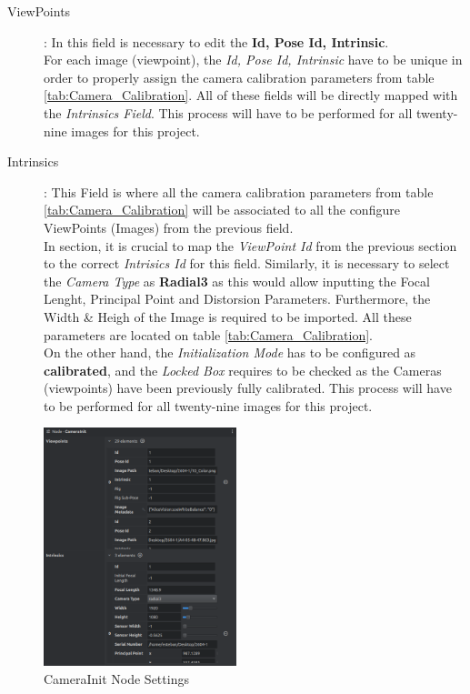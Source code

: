 \documentclass[12pt]{report}
\begin{document}
  \begin{description}
    \item[ViewPoints]: In this field is necessary to edit the \textbf{Id, Pose Id, Intrinsic}. \\
    For each image (viewpoint), the \textit{Id, Pose Id, Intrinsic} have to be unique in order to properly assign the camera calibration parameters from table \ref{tab:Camera_Calibration}. 
    All of these fields will be directly mapped with the \textit{Intrinsics Field}.
    This process will have to be performed for all twenty-nine images for this project. 
    \item[Intrinsics]: This Field is where all the camera calibration parameters from table \ref{tab:Camera_Calibration} will be associated to all the configure ViewPoints (Images) from the previous field.\\
    In section, it is crucial to map the \textit{ViewPoint Id} from the previous section to the correct \textit{Intrisics Id} for this field.
    Similarly, it is necessary to select the \textit{Camera Type} as \textbf{Radial3} as this would allow inputting the Focal Lenght, Principal Point and Distorsion Parameters.
    Furthermore, the Width \& Heigh of the Image is required to be imported. All these parameters are located on table \ref{tab:Camera_Calibration}.\\
    On the other hand, the \textit{Initialization Mode} has to be configured as \textbf{calibrated}, and the \textit{Locked Box} requires to be checked as the Cameras (viewpoints) have been previously fully calibrated.
    This process will have to be performed for all twenty-nine images for this project. 
  
  \end{description}
\enlargethispage{\baselineskip}

  \begin{figure}[H]%
    \centering
   \includegraphics[width=0.5\textwidth]{camera_init_node.png}
  \caption{CameraInit Node Settings}
  \label{fig:camera_init_node} 
  \end{figure}
  
\end{document}
